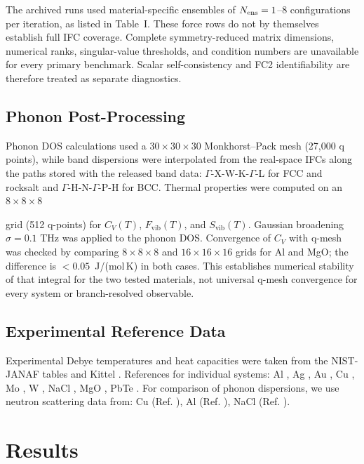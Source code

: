 \documentclass[aps,prb,reprint,amsmath,amssymb,floatfix]{revtex4-2}
\begin{document}
The archived runs used material-specific ensembles of
\(N_{\rm ens}=1\)--8 configurations per iteration, as listed in Table~I.
These force rows do not by themselves establish full IFC coverage. Complete
symmetry-reduced matrix dimensions, numerical ranks, singular-value thresholds,
and condition numbers are unavailable for every primary benchmark. Scalar
self-consistency and FC2 identifiability are therefore treated as separate
diagnostics.

\subsection{Phonon Post-Processing}\label{phonon-post-processing}

Phonon DOS calculations used a \(30\times30\times30\) Monkhorst--Pack mesh
(27,000 q points), while band dispersions were interpolated from the real-space
IFCs along the paths stored with the released band data:
\(\Gamma\)-X-W-K-\(\Gamma\)-L for FCC and rocksalt and
\(\Gamma\)-H-N-\(\Gamma\)-P-H for BCC. Thermal properties were computed on an
\(8\times8\times8\)

grid (512 q-points) for \(C_V(T)\), \(F_\text{vib}(T)\), and
\(S_\text{vib}(T)\). Gaussian broadening \(\sigma = 0.1\) THz was
applied to the phonon DOS. Convergence of \(C_V\) with q-mesh was checked by
comparing \(8\times8\times8\) and \(16\times16\times16\) grids for Al and MgO;
the difference is \(<0.05\)~J/(mol\,K) in both cases. This establishes numerical
stability of that integral for the two tested materials, not universal q-mesh
convergence for every system or branch-resolved observable.

\subsection{Experimental Reference
Data}\label{experimental-reference-data}

Experimental Debye temperatures and heat capacities were taken from the
NIST-JANAF tables \cite{ref20} and Kittel \cite{ref21}. References for
individual systems: Al \cite{ref22}, Ag \cite{ref25}, Au
\cite{ref23}, Cu \cite{ref24,ref33}, Mo \cite{ref26}, W \cite{ref27},
NaCl \cite{ref28}, MgO \cite{ref29,ref30}, PbTe \cite{ref31,ref32}. For
comparison of phonon dispersions, we use neutron scattering data from:
Cu (Ref. \cite{ref33}), Al (Ref. \cite{ref34}), NaCl (Ref.
\cite{ref35}).

\section{Results}\label{results}
\end{document}
